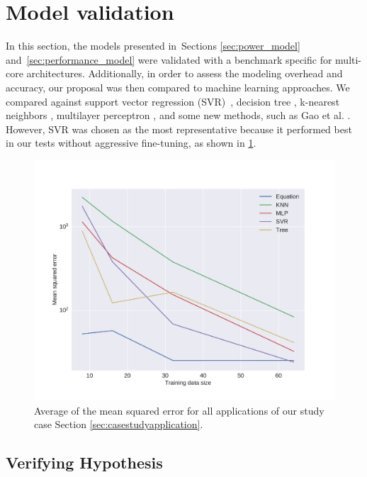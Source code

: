 \section{Model validation} \label{sec:model_validation}
In this section, the models presented in~Sections \ref{sec:power_model} and~\ref{sec:performance_model} were validated with a benchmark specific for multi-core architectures. Additionally, in order to assess the modeling overhead and accuracy, our proposal was then compared to machine learning approaches. We compared against support vector regression (SVR)~\cite{Smola2004ARegression}, decision tree \cite{Kitts2006RegressionLecture}, k-nearest neighbors \cite{Altman1992AnRegression}, multilayer perceptron \cite{Murtagh1991MultilayerRegression}, and some new methods, such as Gao et al. \cite{Gao2019DendriticPrediction}. However, SVR was chosen as the most representative because it performed best in our tests without aggressive fine-tuning, as shown in \cref{fig:ml_models}.

\begin{figure}[H]
	\centering
	\includegraphics[width=\columnwidth]{experiments/figures/ml_models.pdf}
	\caption{Average of the mean squared error for all applications of our study case Section \ref{sec:casestudyapplication}.}
	\label{fig:ml_models}
\end{figure}

\subsection{Verifying Hypothesis} \label{subsec:ev_verifying_hypothesis}


